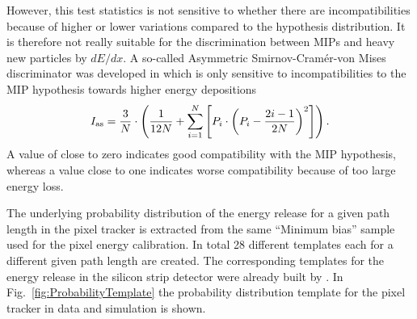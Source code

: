 However, this test statistics is not sensitive to whether there are incompatibilities because of higher or lower variations compared to the hypothesis distribution.
It is therefore not really suitable for the discrimination between MIPs and heavy new particles by $dE/dx$.
A so-called Asymmetric Smirnov-Cram\'{e}r-von Mises discriminator was developed in \cite{bib:Quertenmont_2010} which is only sensitive to incompatibilities to the MIP hypothesis towards higher energy depositions
\begin{equation*}
I_{\text{as}} = \frac{3}{N} \cdot \left( \frac{1}{12N} + \sum\limits_{i=1}^N \left[ P_i \cdot \left(P_i - \frac{2i-1}{2N} \right)^2 \right] \right).
\end{equation*}
A value of \ias close to zero indicates good compatibility with the MIP hypothesis, whereas a value close to one indicates worse compatibility because of too large energy loss.

The underlying probability distribution of the energy release for a given path length in the pixel tracker is extracted from the same ``Minimum bias'' sample used for the pixel energy calibration.
In total 28 different templates each for a different given path length are created.
The corresponding templates for the energy release in the silicon strip detector were already built by  \cite{bib:Quertenmont_2010}.
In Fig.~\ref{fig:ProbabilityTemplate} the probability distribution template for the pixel tracker in data and simulation is shown.

